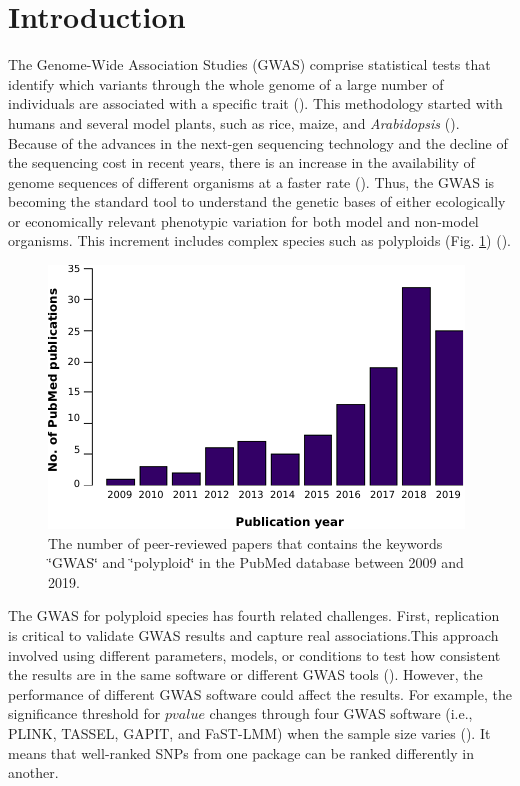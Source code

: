 \documentclass{article}
\begin{document}
\section{Introduction}
The Genome-Wide Association Studies (GWAS) comprise statistical tests that identify which variants through the whole genome of a large number of individuals are associated with a specific trait (\cite{cantor2010prioritizing,begum2012comprehensive}). This methodology started with humans and several model plants, such as rice, maize, and \emph{Arabidopsis} (\cite{lauc2010genomics,tian2011genome,cao2011whole,korte2013advantages,han2013sequencing}). Because of the advances in the next-gen sequencing technology and the decline of the sequencing cost in recent years, there is an increase in the availability of genome sequences of different organisms at a faster rate (\cite{ekblom2011applications,ellegren2014genome}). Thus, the GWAS is becoming the standard tool to understand the genetic bases of either ecologically or economically relevant phenotypic variation for both model and non-model organisms. This increment includes complex species such as polyploids (Fig. \ref{GWASpolyploids}) (\cite{ekblom2011applications,santure2018wild}).

\begin{figure}[H]
\begin{centering}
\includegraphics{01_figure-GWASpolyploids-PubMed.pdf}
\par\end{centering}
\caption{The number of peer-reviewed papers that contains the keywords \char`\"{}GWAS\char`\"{} and \char`\"{}polyploid\char`\"{} in the PubMed database between 2009 and 2019.\label{GWASpolyploids}}
\end{figure}

The GWAS for polyploid species has fourth related challenges. First, replication is critical to validate GWAS results and capture real associations.This approach involved using different parameters, models, or conditions to test how consistent the results are in the same software or different GWAS tools (\cite{De2014,Pearson2008}). However, the performance of different GWAS software could affect the results. For example, the significance threshold for $pvalue$ changes through four GWAS software (i.e., PLINK, TASSEL, GAPIT, and FaST-LMM) when the sample size varies (\cite{Yan2019}). It means that well-ranked SNPs from one package can be ranked differently in another.
\end{document}
